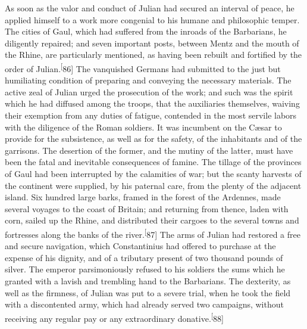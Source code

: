

As soon as the valor and conduct of Julian had secured an
interval of peace, he applied himself to a work more congenial to
his humane and philosophic temper. The cities of Gaul, which had
suffered from the inroads of the Barbarians, he diligently
repaired; and seven important posts, between Mentz and the mouth
of the Rhine, are particularly mentioned, as having been rebuilt
and fortified by the order of Julian.\textsuperscript[86] The vanquished Germans
had submitted to the just but humiliating condition of preparing
and conveying the necessary materials. The active zeal of Julian
urged the prosecution of the work; and such was the spirit which
he had diffused among the troops, that the auxiliaries
themselves, waiving their exemption from any duties of fatigue,
contended in the most servile labors with the diligence of the
Roman soldiers. It was incumbent on the Cæsar to provide for the
subsistence, as well as for the safety, of the inhabitants and of
the garrisons. The desertion of the former, and the mutiny of the
latter, must have been the fatal and inevitable consequences of
famine. The tillage of the provinces of Gaul had been interrupted
by the calamities of war; but the scanty harvests of the
continent were supplied, by his paternal care, from the plenty of
the adjacent island. Six hundred large barks, framed in the
forest of the Ardennes, made several voyages to the coast of
Britain; and returning from thence, laden with corn, sailed up
the Rhine, and distributed their cargoes to the several towns and
fortresses along the banks of the river.\textsuperscript[87] The arms of Julian
had restored a free and secure navigation, which Constantinius
had offered to purchase at the expense of his dignity, and of a
tributary present of two thousand pounds of silver. The emperor
parsimoniously refused to his soldiers the sums which he granted
with a lavish and trembling hand to the Barbarians. The
dexterity, as well as the firmness, of Julian was put to a severe
trial, when he took the field with a discontented army, which had
already served two campaigns, without receiving any regular pay
or any extraordinary donative.\textsuperscript[88]


